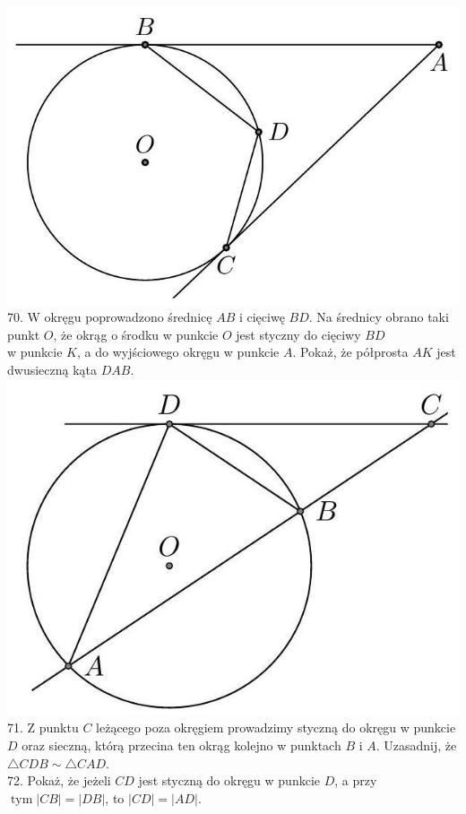 \documentclass[10pt]{article}
\begin{document}
\includegraphics[max width=\textwidth, center]{2024_11_21_e9b4faa005d5be2cc318g-045(1)}\\
70. W okręgu poprowadzono średnicę \(A B\) i cięciwę \(B D\). Na średnicy obrano taki punkt \(O\), że okrąg o środku w punkcie \(O\) jest styczny do cięciwy \(B D\)\\
w punkcie \(K\), a do wyjściowego okręgu w punkcie \(A\). Pokaż, że półprosta \(A K\) jest dwusieczną kąta \(D A B\).\\
\includegraphics[max width=\textwidth, center]{2024_11_21_e9b4faa005d5be2cc318g-046}\\
71. Z punktu \(C\) leżącego poza okręgiem prowadzimy styczną do okręgu w punkcie \(D\) oraz sieczną, którą przecina ten okrąg kolejno w punktach \(B\) i \(A\). Uzasadnij, że \(\triangle C D B \sim \triangle C A D\).\\
72. Pokaż, że jeżeli \(C D\) jest styczną do okręgu w punkcie \(D\), a przy \(\operatorname{tym}|C B|=|D B|\), to \(|C D|=|A D|\).
\end{document}
